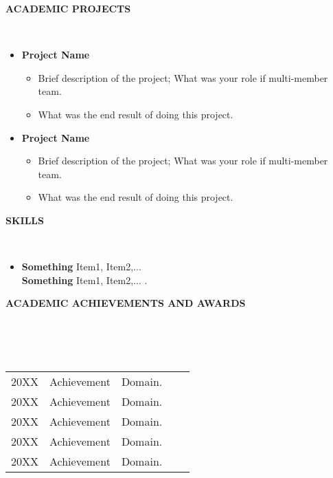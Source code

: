 \documentclass[a4paper,10pt]{article}
\newcommand{\lsep}{-0.5cm}
\newcommand{\resheading}[1]
{{
	\small \colorbox{mygrey}
	{\begin{minipage}
		{1.0\textwidth}
		{\textbf{#1 \vphantom{p\^{E}}}}
	\end{minipage}}
}}
\begin{document}
	\resheading{\textbf{ACADEMIC PROJECTS} }\\ [-0.45cm]
	\begin{itemize}
	
		\item \textbf{Project Name}\\[\lsep]
		\begin{itemize}[noitemsep,topsep=0pt]
			\item Brief description of the project; What was your role if multi-member team. 
			\item What was the end result of doing this project.
		\end{itemize}

		\item \textbf{Project Name}\\[\lsep]
		\begin{itemize}[noitemsep,topsep=0pt]
			\item Brief description of the project; What was your role if multi-member team. 
			\item What was the end result of doing this project.
		\end{itemize}
	
	\end{itemize}

	\resheading{\textbf{SKILLS} }\\[-0.3cm]
	\begin{itemize}
		\item \noindent \textbf{Something} Item1, Item2,...\\
		\textbf{Something} Item1, Item2,... .
	\end{itemize}

	\resheading{\textbf{ACADEMIC ACHIEVEMENTS AND AWARDS} }\\[-0.4cm]
	\\ \\
	\indent 
	\begin{tabular}
		{ l @{\hskip 0.15in} l @{\hskip 0.15in} l @{\hskip 0.15in} l @{\hskip 0.15in} l }
		20XX         & {Achievement}  & Domain.\\
		20XX         & {Achievement}  & Domain.\\
		20XX         & {Achievement}  & Domain.\\
		20XX         & {Achievement}  & Domain.\\
		20XX         & {Achievement}  & Domain.\\
	\end{tabular}
\end{document}
